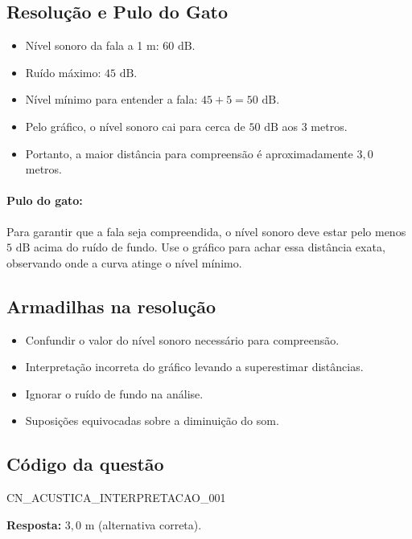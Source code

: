 \documentclass{article}
\begin{document}
\subsection*{Resolução e Pulo do Gato}
\begin{itemize}
  \item Nível sonoro da fala a 1 m: $60\text{ dB}$.
  \item Ruído máximo: $45\text{ dB}$.
  \item Nível mínimo para entender a fala: $45 + 5 = 50\text{ dB}$.
  \item Pelo gráfico, o nível sonoro cai para cerca de $50\text{ dB}$ aos 3 metros.
  \item Portanto, a maior distância para compreensão é aproximadamente $3,0$ metros.
\end{itemize}

\paragraph{Pulo do gato:} Para garantir que a fala seja compreendida, o nível sonoro deve estar pelo menos $5\text{ dB}$ acima do ruído de fundo. Use o gráfico para achar essa distância exata, observando onde a curva atinge o nível mínimo.

\subsection*{Armadilhas na resolução}
\begin{itemize}
  \item Confundir o valor do nível sonoro necessário para compreensão.
  \item Interpretação incorreta do gráfico levando a superestimar distâncias.
  \item Ignorar o ruído de fundo na análise.
  \item Suposições equivocadas sobre a diminuição do som.
\end{itemize}

\subsection*{Código da questão}
CN\_ACUSTICA\_INTERPRETACAO\_001

\bigskip

\textbf{Resposta:} $\boxed{3,0\text{ m}}$ (alternativa correta).
\end{document}
